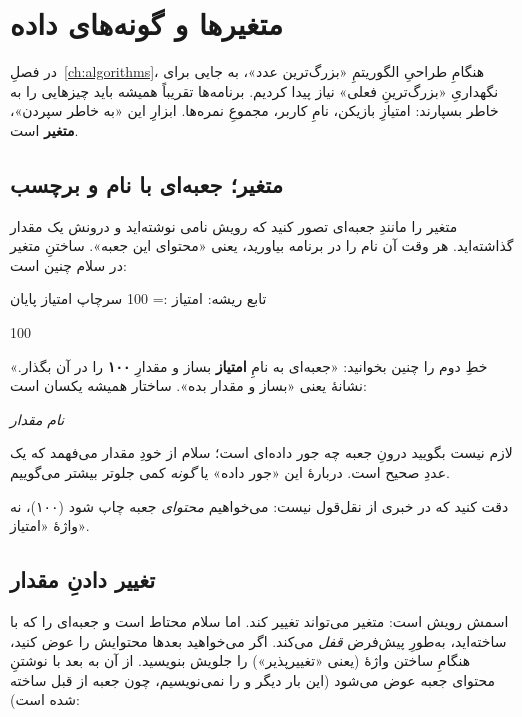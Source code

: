 \chapter{متغیرها و گونه‌های داده}%
\label{ch:variables}

در فصلِ~\ref{ch:algorithms}، هنگامِ طراحیِ الگوریتمِ «بزرگ‌ترین عدد»، به
جایی برای نگهداریِ «بزرگ‌ترینِ فعلی» نیاز پیدا کردیم. برنامه‌ها تقریباً
همیشه باید چیزهایی را به خاطر بسپارند: امتیازِ بازیکن، نامِ کاربر، مجموعِ
نمره‌ها. ابزارِ این «به خاطر سپردن»، \textbf{متغیر} است.

\section{متغیر؛ جعبه‌ای با نام و برچسب}

متغیر را مانندِ جعبه‌ای تصور کنید که رویش نامی نوشته‌اید و درونش یک مقدار
گذاشته‌اید. هر وقت آن نام را در برنامه بیاورید، یعنی «محتوای این جعبه».
ساختنِ متغیر در سلام چنین است:

\begin{salamfa}
تابع ریشه:
    امتیاز := 100
    سرچاپ امتیاز
پایان
\end{salamfa}

\begin{progout}
100
\end{progout}

خطِ دوم را چنین بخوانید: «جعبه‌ای به نامِ \textbf{امتیاز} بساز و مقدارِ
\textbf{۱۰۰} را در آن بگذار.» نشانهٔ \code{:=} یعنی «بساز و مقدار بده».
ساختار همیشه یکسان است:

\begin{center}
\textit{نام} \code{:=} \textit{مقدار}
\end{center}

لازم نیست بگویید درونِ جعبه چه جور داده‌ای است؛ سلام از خودِ مقدار
می‌فهمد که  یک عددِ صحیح است. دربارهٔ این «جور داده» یا
\emph{گونه} کمی جلوتر بیشتر می‌گوییم.

دقت کنید که در  خبری از نقل‌قول نیست: می‌خواهیم
\emph{محتوای} جعبه چاپ شود (۱۰۰)، نه واژهٔ «امتیاز».

\section{تغییر دادنِ مقدار}

اسمش رویش است: متغیر می‌تواند تغییر کند. اما سلام محتاط است و جعبه‌ای را که
با \code{:=} ساخته‌اید، به‌طورِ پیش‌فرض \emph{قفل} می‌کند. اگر می‌خواهید
بعدها محتوایش را عوض کنید، هنگامِ ساختن واژهٔ  (یعنی «تغییرپذیر»)
را جلویش بنویسید. از آن به بعد با نوشتنِ  محتوای جعبه
عوض می‌شود (این بار دیگر  و \code{:=} را نمی‌نویسیم، چون جعبه از
قبل ساخته شده است):

